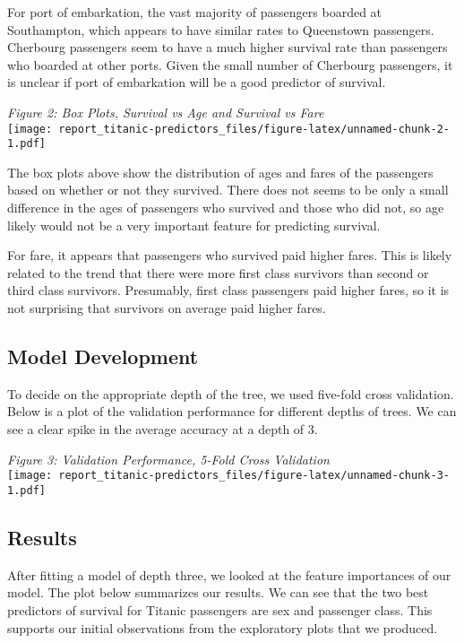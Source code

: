 \documentclass[]{article}
\begin{document}
For port of embarkation, the vast majority of passengers boarded at
Southampton, which appears to have similar rates to Queenstown
passengers. Cherbourg passengers seem to have a much higher survival
rate than passengers who boarded at other ports. Given the small number
of Cherbourg passengers, it is unclear if port of embarkation will be a
good predictor of survival.

\emph{Figure 2: Box Plots, Survival vs Age and Survival vs Fare}\\
\texttt{[image: report\_titanic-predictors\_files/figure-latex/unnamed-chunk-2-1.pdf]}

The box plots above show the distribution of ages and fares of the
passengers based on whether or not they survived. There does not seems
to be only a small difference in the ages of passengers who survived and
those who did not, so age likely would not be a very important feature
for predicting survival.

For fare, it appears that passengers who survived paid higher fares.
This is likely related to the trend that there were more first class
survivors than second or third class survivors. Presumably, first class
passengers paid higher fares, so it is not surprising that survivors on
average paid higher fares.

\subsection{Model Development}\label{model-development}

To decide on the appropriate depth of the tree, we used five-fold cross
validation. Below is a plot of the validation performance for different
depths of trees. We can see a clear spike in the average accuracy at a
depth of 3.

\emph{Figure 3: Validation Performance, 5-Fold Cross Validation}\\
\texttt{[image: report\_titanic-predictors\_files/figure-latex/unnamed-chunk-3-1.pdf]}

\subsection{Results}\label{results}

After fitting a model of depth three, we looked at the feature
importances of our model. The plot below summarizes our results. We can
see that the two best predictors of survival for Titanic passengers are
sex and passenger class. This supports our initial observations from the
exploratory plots that we produced.
\end{document}
